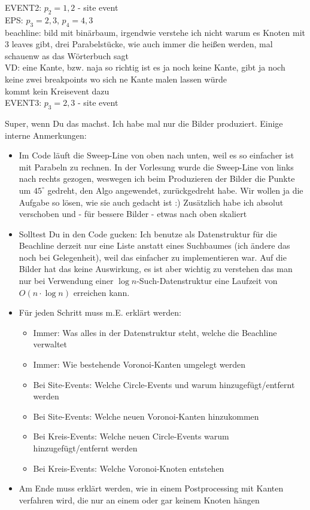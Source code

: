 EVENT2: $p_2={1,2}$ - site event\\
EPS: $p_3={2,3}$, $p_4={4,3}$\\
beachline: bild mit binärbaum, irgendwie verstehe ich nicht warum es Knoten mit 3 leaves gibt, drei Parabelstücke, wie auch immer die heißen werden, mal schauenw as das Wörterbuch sagt\\
VD: eine Kante, bzw. naja so richtig ist es ja noch keine Kante, gibt ja noch keine zwei breakpoints wo sich ne Kante malen lassen würde\\
kommt kein Kreisevent dazu\\

EVENT3: $p_3={2,3}$ - site event




Super, wenn Du das machst. Ich habe mal nur die Bilder produziert. Einige interne Anmerkungen:
\begin{itemize}
\item Im Code läuft die Sweep-Line von oben nach unten, weil es so einfacher ist mit Parabeln zu rechnen. In der Vorlesung wurde die Sweep-Line von links nach rechts gezogen, weswegen ich beim Produzieren der Bilder die Punkte um $45^\circ$ gedreht, den Algo angewendet, zurückgedreht habe. Wir wollen ja die Aufgabe so lösen, wie sie auch gedacht ist :) Zusätzlich habe ich absolut verschoben und - für bessere Bilder - etwas nach oben skaliert
\item Solltest Du in den Code gucken: Ich benutze als Datenstruktur für die Beachline derzeit nur eine Liste anstatt eines Suchbaumes (ich ändere das noch bei Gelegenheit), weil das einfacher zu implementieren war. Auf die Bilder hat das keine Auswirkung, es ist aber wichtig zu verstehen das man nur bei Verwendung einer $\log n$-Such-Datenstruktur eine Laufzeit von $O(n\cdot\log n)$ erreichen kann.
\item Für jeden Schritt muss m.E. erklärt werden:
\begin{itemize}
\item Immer: Was alles in der Datenstruktur steht, welche die Beachline verwaltet
\item Immer: Wie bestehende Voronoi-Kanten umgelegt werden
\item Bei Site-Events: Welche Circle-Events und warum hinzugefügt/entfernt werden
\item Bei Site-Events: Welche neuen Voronoi-Kanten hinzukommen
\item Bei Kreis-Events: Welche neuen Circle-Events warum hinzugefügt/entfernt werden
\item Bei Kreis-Events: Welche Voronoi-Knoten entstehen
\end{itemize}
\item Am Ende muss erklärt werden, wie in einem Postprocessing mit Kanten verfahren wird, die nur an einem oder gar keinem Knoten hängen 
\end{itemize}

